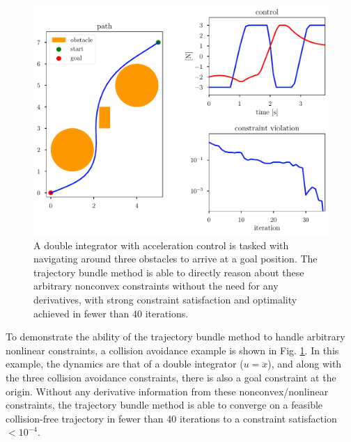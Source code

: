 \begin{figure}
    \centering
    \includegraphics[width=0.9\linewidth]{bundles/examples/obstacle_fig.pdf}
    \caption{A double integrator with acceleration control is tasked with navigating around three obstacles to arrive at a goal position. The trajectory bundle method is able to directly reason about these arbitrary nonconvex constraints without the need for any derivatives, with strong constraint satisfaction and optimality achieved in fewer than 40 iterations.}
    \label{fig:btb:obstacle}
\end{figure}


To demonstrate the ability of the trajectory bundle method to handle arbitrary nonlinear constraints, a collision avoidance example is shown in Fig. \ref{fig:btb:obstacle}. In this example, the dynamics are that of a double integrator ($u = \ddot{x}$), and along with the three collision avoidance constraints, there is also a goal constraint at the origin. Without any derivative information from these nonconvex/nonlinear constraints, the trajectory bundle method is able to converge on a feasible collision-free trajectory in fewer than 40 iterations to a constraint satisfaction $<10^{-4}$.








